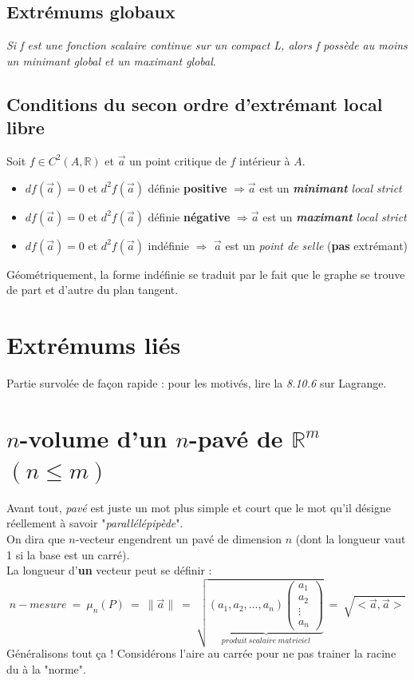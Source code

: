 \documentclass[11pt, a4paper, openany]{book}
\begin{document}
\subsection{Extrémums globaux}
\textit{Si f est une fonction scalaire continue sur un compact L, alors f possède au moins un minimant global et un maximant global}.

\subsection{Conditions du secon ordre d'extrémant local libre}
Soit $f \in C^2 (A, \mathbb{R})$ et $\vec{a}$ un point critique de $f$ intérieur à $A$.
\begin{itemize}
	\item $df(\vec{a}) = 0$ et $d^2f(\vec{a})$ définie \textbf{positive} $\Rightarrow \vec{a}$ est un \textit{\textbf{minimant} local strict}
	\item $df(\vec{a}) = 0$ et $d^2f(\vec{a})$ définie \textbf{négative} $\Rightarrow \vec{a}$ est un \textit{\textbf{maximant} local strict}
	\item $df(\vec{a}) = 0$ et $d^2f(\vec{a})$ indéfinie $\Rightarrow$ $\vec{a}$ est un \textit{point de selle} (\textbf{pas} extrémant)
\end{itemize}
Géométriquement, la forme indéfinie se traduit par le fait que le graphe se trouve de part et d'autre du plan tangent.

\section{Extrémums liés}
Partie survolée de façon rapide : pour les motivés, lire la \textit{8.10.6} sur Lagrange.

\section{$n$-volume d'un $n$-pavé de $\mathbb{R}^m$ $(n \leq m)$}
Avant tout, \textit{pavé} est juste un mot plus simple et court que le mot qu'il désigne réellement à savoir "\textit{parallélépipède}".\\
On dira que $n$-vecteur engendrent un pavé de dimension $n$ (dont la longueur vaut 1 si la base est un carré).\\

La longueur d'\textbf{un} vecteur peut se définir : 
$$n-mesure\ =\ \mu_n(P)\ =\ \parallel\vec{a}\parallel\ =\ \sqrt{\underbrace{\left(a_1, a_2, ..., a_n\right)\begin{pmatrix}
	a_1\\
	a_2\\
	\vdots\\
	a_n
	\end{pmatrix}}_{produit\ scalaire\ matriciel}}\ =\ \sqrt{<\vec{a}, \vec{a}>} $$
Généralisons tout ça ! Considérons l'aire au carrée pour ne pas trainer la racine du à la "norme".
\end{document}
